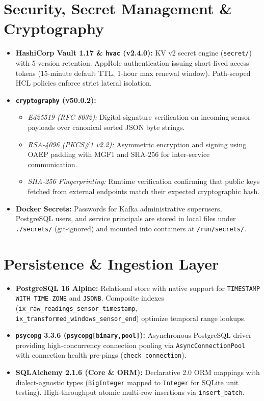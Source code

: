 \documentclass[10pt,a4paper]{report}
\begin{document}
\section{Security, Secret Management \& Cryptography}
\begin{itemize}[leftmargin=*]
  \item \textbf{HashiCorp Vault 1.17 \& \texttt{hvac} (v2.4.0):} KV v2 secret engine (\texttt{secret/}) with 5-version retention. AppRole authentication issuing short-lived access tokens (15-minute default TTL, 1-hour max renewal window). Path-scoped HCL policies enforce strict lateral isolation.
  \item \textbf{\texttt{cryptography} (v50.0.2):}
  \begin{itemize}
    \item \textit{Ed25519 (RFC 8032):} Digital signature verification on incoming sensor payloads over canonical sorted JSON byte strings.
    \item \textit{RSA-4096 (PKCS\#1 v2.2):} Asymmetric encryption and signing using OAEP padding with MGF1 and SHA-256 for inter-service communication.
    \item \textit{SHA-256 Fingerprinting:} Runtime verification confirming that public keys fetched from external endpoints match their expected cryptographic hash.
  \end{itemize}
  \item \textbf{Docker Secrets:} Passwords for Kafka administrative superusers, PostgreSQL users, and service principals are stored in local files under \texttt{./secrets/} (git-ignored) and mounted into containers at \texttt{/run/secrets/}.
\end{itemize}

\section{Persistence \& Ingestion Layer}
\begin{itemize}[leftmargin=*]
  \item \textbf{PostgreSQL 16 Alpine:} Relational store with native support for \texttt{TIMESTAMP WITH TIME ZONE} and \texttt{JSONB}. Composite indexes (\texttt{ix\_raw\_readings\_sensor\_timestamp}, \texttt{ix\_transformed\_windows\_sensor\_end}) optimize temporal range lookups.
  \item \textbf{\texttt{psycopg} 3.3.6 (\texttt{psycopg[binary,pool]}):} Asynchronous PostgreSQL driver providing high-concurrency connection pooling via \texttt{AsyncConnectionPool} with connection health pre-pings (\texttt{check\_connection}).
  \item \textbf{SQLAlchemy 2.1.6 (Core \& ORM):} Declarative 2.0 ORM mappings with dialect-agnostic types (\texttt{BigInteger} mapped to \texttt{Integer} for SQLite unit testing). High-throughput atomic multi-row insertions via \texttt{insert\_batch}.
\end{itemize}
\end{document}
